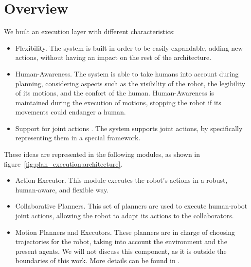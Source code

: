 \section{Overview}
\label{sec:plan_execution-overview}

We built an execution layer with different characteristics:
\begin{itemize}
\item Flexibility. The system is built in order to be easily expandable, adding new actions, without having an impact on the rest of the architecture.
\item Human-Awareness. The system is able to take humans into account during planning, considering aspects such as the visibility of the robot, the legibility of its motions, and the confort of the human. Human-Awareness is maintained during the execution of motions, stopping the robot if its movements could endanger a human.
\item Support for joint actions . The system supports joint actions, by specifically representing them in a special framework. 
\end{itemize}

These ideas are represented in the following modules, as shown in figure~\ref{fig:plan_execution:architecture}.
\begin{itemize}
	\item Action Executor. This module executes the robot's actions in a robust, human-aware, and flexible way.
	\item Collaborative Planners. This set of planners are used to execute human-robot joint actions, allowing the robot to adapt its actions to the collaborators.
	\item Motion Planners and Executors. These planners are in charge of choosing trajectories for the robot, taking into account the environment and the present agents. We will not discuss this component, as it is outside the boundaries of this work. More details can be found in \cite{Sisbot2008,Mainprice2011,Pandey2010}.
\end{itemize}


